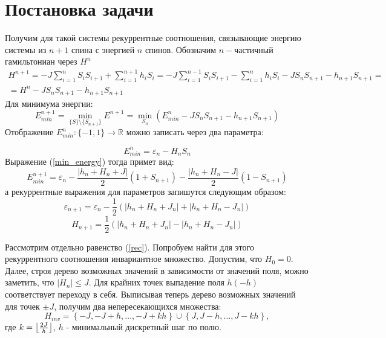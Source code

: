 
\section{Постановка задачи}
	
	\newtheorem{ut}{Утверждение}
	\newtheorem*{zam}{Замечание}
	Получим для такой системы рекуррентные соотношения, связывающие энергию системы из $n+1$ спина с энергией $n$ спинов.  Обозначим $n-$частичный гамильтониан через $H^n$
	\begin{multline}
		H^{n+1} = - J\sum_{i=1} ^{n}  S_i S_{i+1} + \sum_{i=1}^{n+1} h_i S_i  = 
		-J \sum_{i=1}^{n-1} S_{i} S_{i+1} - \sum_{i=1}^{n} h_i S_i - J S_n S_{n+1} - h_{n+1} S_{n+1} = \\=
		H^n - J S_n S_{n+1} - h_{n+1} S_{n+1} 
	\end{multline}
	Для минимума энергии:
	\begin{equation}
	\label{min_energy}
	E_{min}^{n+1} = \min_{\{S\}\setminus \{S_{n+1}\}} E^{n+1} = \min_{S_n}(E_{min}^{n} - J S_n S_{n+1} - h_{n+1} S_{n+1})
	\end{equation}
	Отображение $E_{min}^n : \{-1, 1\}  \to \mathbb{R}$ можно записать через два параметра:
	
	\begin{equation}
	E^n_{min} = \varepsilon_n - H_n S_n
	\end{equation}
	Выражение (\ref{min_energy}) тогда примет вид:
	\begin{equation}
	E_{min}^{n+1} = \varepsilon_n - \frac {\left|h_n +H_n+J\right|} 2 (1+S_{n+1})  - \frac{\left|h_n+H_n-J\right|} 2 (1 - S_{n+1})
	\end{equation}
	а рекуррентные выражения для параметров запишутся следующим образом: 
	\begin{equation}
	\varepsilon_{n+1} = \varepsilon_n - \frac{1} 2 \left(|h_n + H_n + J_n| + |h_n+H_n - J_n| \right)
	\end{equation}
	\begin{equation}
	\label{rec}
	H_{n+1} = \frac{1}{2} \left(|h_n + H_n + J_n| - |h_n + H_n - J_n| \right)
	\end{equation}

	Рассмотрим отдельно равенство (\ref{rec}). 
	Попробуем найти для этого рекуррентного соотношения инвариантное множество. Допустим, что $H_0=0$.
	 Далее, строя дерево возможных значений в зависимости от значений поля, можно заметить, что $|H_{n}| \leq J$. Для крайних точек выпадение поля $h (-h)$ соответствует переходу в себя.
	Выписывая теперь дерево возможных значений для точек $\pm J$, получим два непересекающихся множества:
	 \begin{equation}
		H_{inv} = \left\{ -J, -J + h, \dots, -J + kh \right\} \cup \left\{ J, J - h, \dots, J - kh \right\},
	\end{equation}
	где $k = \floor*{ \frac{2J}{h}}$, $h$ - минимальный дискретный шаг по полю.

